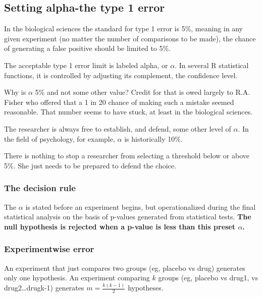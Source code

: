 \documentclass[]{book}
\begin{document}
\hypertarget{setting-alpha-the-type-1-error}{%
\subsection{Setting alpha-the type 1 error}\label{setting-alpha-the-type-1-error}}

In the biological sciences the standard for type 1 error is 5\%, meaning in any given experiment (no matter the number of comparisons to be made), the chance of generating a false positive should be limited to 5\%.

The acceptable type 1 error limit is labeled alpha, or \(\alpha\). In several R statistical functions, it is controlled by adjusting its complement, the confidence level.

Why is \(\alpha\) 5\% and not some other value? Credit for that is owed largely to R.A. Fisher who offered that a 1 in 20 chance of making such a mistake seemed reasonable. That number seems to have stuck, at least in the biological sciences.

The researcher is always free to establish, and defend, some other level of \(\alpha\). In the field of psychology, for example, \(\alpha\) is historically 10\%.

There is nothing to stop a researcher from selecting a threshold below or above 5\%. She just needs to be prepared to defend the choice.

\hypertarget{the-decision-rule}{%
\subsubsection{The decision rule}\label{the-decision-rule}}

The \(\alpha\) is stated before an experiment begins, but operationalized during the final statistical analysis on the basis of p-values generated from statistical tests. \textbf{The null hypothesis is rejected when a p-value is less than this preset \(\alpha\).}

\hypertarget{experimentwise-error}{%
\subsubsection{Experimentwise error}\label{experimentwise-error}}

An experiment that just compares two groups (eg, placebo vs drug) generates only one hypothesis. An experiment comparing \(k\) groups (eg, placebo vs drug1, vs drug2\ldots{}drugk-1) generates \(m=\frac{k(k-1)}{2}\) hypotheses.
\end{document}
